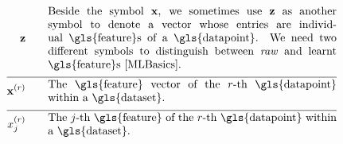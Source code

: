 \begin{align}
	\rawfeaturevec \quad\quad &\parbox{.75\textwidth}{Beside the symbol $\featurevec$, we 
		sometimes use $\rawfeaturevec$ as another symbol to denote a vector whose entries 
		are individual \gls{feature}s of a \gls{datapoint}. We need two 
		different symbols to distinguish between \emph{raw} and learnt \gls{feature}s \cite[Ch. 9]{MLBasics}.}\nonumber \\[2mm] \hline \nonumber\\[-5mm]
	\featurevec^{(\sampleidx)} \quad\quad &\parbox{.75\textwidth}{The \gls{feature} vector of the $\sampleidx$-th \gls{datapoint} within a \gls{dataset}. } \nonumber \\[2mm] \hline \nonumber\\[-5mm]
	\feature_{\featureidx}^{(\sampleidx)}\quad\quad &\parbox{.75\textwidth}{The $\featureidx$-th \gls{feature} of the $\sampleidx$-th 
		\gls{datapoint} within a \gls{dataset}.} \nonumber
\end{align}        


